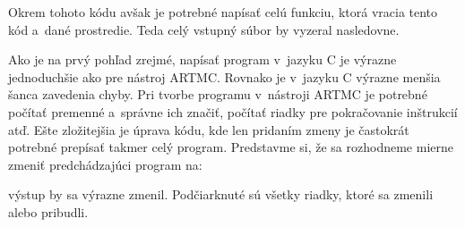 \noindent
Okrem tohoto kódu avšak je potrebné napísať celú funkciu, ktorá vracia tento kód a~dané prostredie.
Teda celý vstupný súbor by vyzeral nasledovne.


\noindent
Ako je na prvý pohľad zrejmé, napísať program v~jazyku C je výrazne jednoduchšie ako pre nástroj ARTMC. Rovnako je v~jazyku C výrazne menšia šanca zavedenia chyby. Pri tvorbe programu v~nástroji ARTMC je potrebné počítať premenné a~správne ich značiť, počítať riadky pre pokračovanie inštrukcií atď. Ešte zložitejšia je úprava kódu, kde len pridaním zmeny je častokrát potrebné prepísať takmer celý program. Predstavme si, že sa rozhodneme mierne zmeniť predchádzajúci program na:


\noindent
výstup by sa výrazne zmenil. Podčiarknuté sú všetky riadky, ktoré sa zmenili alebo pribudli.

